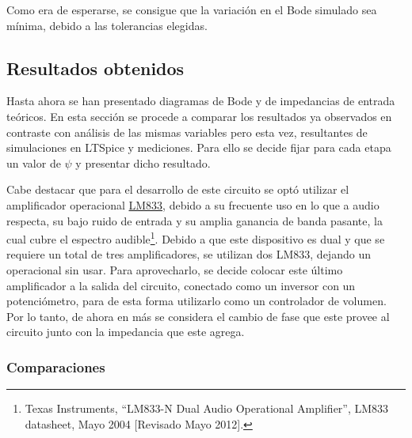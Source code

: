 Como era de esperarse, se consigue que la variación en el Bode simulado sea mínima, debido a las tolerancias elegidas.

\subsection{Resultados obtenidos}

Hasta ahora se han presentado diagramas de Bode y de impedancias de entrada teóricos. En esta sección se procede a comparar los resultados ya observados en contraste con análisis de las mismas variables pero esta vez, resultantes de simulaciones en LTSpice y mediciones. Para ello se decide fijar para cada etapa un valor de $\psi$ y presentar dicho resultado.

Cabe destacar que para el desarrollo de este circuito se optó utilizar el amplificador operacional \href{http://www.ti.com/lit/ds/symlink/lm833-n.pdf}{LM833}, debido a su frecuente uso en lo que a audio respecta, su bajo ruido de entrada y su amplia ganancia de banda pasante, la cual cubre el espectro audible\footnote{Texas Instruments, ``LM833-N Dual Audio Operational Amplifier'', LM833 datasheet, Mayo 2004 [Revisado Mayo 2012].}. Debido a que este dispositivo es dual y que se requiere un total de tres amplificadores, se utilizan dos LM833, dejando un operacional sin usar. Para aprovecharlo, se decide colocar este último amplificador a la salida del circuito, conectado como un inversor con un potenciómetro, para de esta forma utilizarlo como un controlador de volumen. Por lo tanto, de ahora en más se considera el cambio de fase que este provee al circuito junto con la impedancia que este agrega.   

\subsubsection{Comparaciones}

